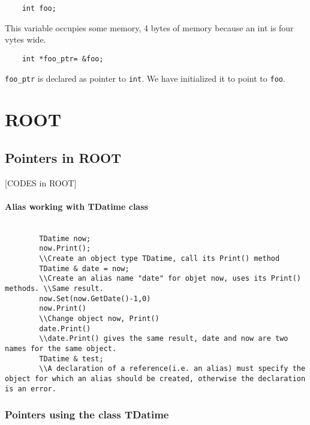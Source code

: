 \documentclass[12pt]{article}
\begin{document}
\begin{itemize}
	\begin{verbatim}
	int foo;
	\end{verbatim}

	This variable occupies some memory, 4 bytes of
	memory because an int is four vytes wide.

	\begin{verbatim}
	int *foo_ptr= &foo;
	\end{verbatim}

	\verb|foo_ptr| is declared as pointer to \verb|int|. We have initialized it to point to \verb|foo|.


	\newpage
	\chapter{ROOT}

	\section{Pointers in ROOT}



	[CODES in ROOT]

		\subsubsection{Alias  working with TDatime class}


		\begin{verbatim}

		TDatime now;
		now.Print();
		\\Create an object type TDatime, call its Print() method
		TDatime & date = now;
		\\Create an alias name "date" for objet now, uses its Print() methods. \\Same result.
		now.Set(now.GetDate()-1,0)
		now.Print()
		\\Change object now, Print()
		date.Print()
		\\date.Print() gives the same result, date and now are two names for the same object.
		TDatime & test;
		\\A declaration of a reference(i.e. an alias) must specify the object for which an alias should be created, otherwise the declaration is an error.
		\end{verbatim}

	\subsection{Pointers using the class TDatime }


\end{itemize}
\end{document}
